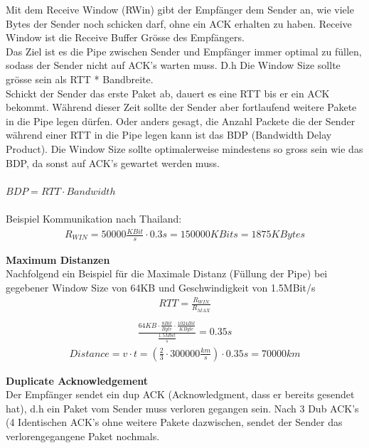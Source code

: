Mit dem Receive Window (RWin) gibt der Empfänger dem Sender an, wie viele Bytes der Sender noch schicken darf, ohne ein ACK erhalten zu haben. Receive Window ist die Receive Buffer Grösse des Empfängers.\\
Das Ziel ist es die Pipe zwischen Sender und Empfänger immer optimal zu füllen, sodass der Sender nicht auf ACK's warten muss. D.h Die Window Size sollte grösse sein als RTT * Bandbreite.\\
Schickt der Sender das erste Paket ab, dauert es eine RTT bis er ein ACK bekommt. Während dieser Zeit sollte der Sender aber fortlaufend weitere Pakete in die Pipe legen dürfen. Oder anders gesagt, die Anzahl Packete die der Sender während einer RTT in die Pipe legen kann ist das BDP (Bandwidth Delay Product). Die Window Size sollte optimalerweise mindestens so gross sein wie das BDP, da sonst auf ACK's gewartet werden muss.\\\\
$BDP=RTT \cdot Bandwidth$\\\\
Beispiel Kommunikation nach Thailand:\\

\begin{align*}
R_{WIN} = 50000 \frac{KBit}{s} \cdot 0.3s = 150000 KBits = 1875 KBytes
\end{align*}

\textbf{Maximum Distanzen}\\
Nachfolgend ein Beispiel für die Maximale Distanz (Füllung der Pipe) bei gegebener Window Size von 64KB und Geschwindigkeit von 1.5MBit/s
\begin{align*}
RTT = \frac{R_{WIN}}{R_{MAX}}\\
\end{align*}
\begin{align*}
\frac{64KB \cdot \frac{8Bit}{Byte} \cdot \frac{1024Bit}{KByte}}{\frac{1.5Mbit}{s}} = 0.35s
\end{align*}
\begin{align*}
Distance = v \cdot t =(\frac{2}{3} \cdot 300000 \frac{km}{s})\cdot 0.35s = 70000km
\end{align*}

\textbf{Duplicate Acknowledgement}\\
Der Empfänger sendet ein dup ACK (Acknowledgment, dass er bereits gesendet hat), d.h ein Paket vom Sender muss verloren gegangen sein. Nach 3 Dub ACK's (4 Identischen ACK's ohne weitere Pakete dazwischen, sendet der Sender das verlorengegangene Paket nochmals.


